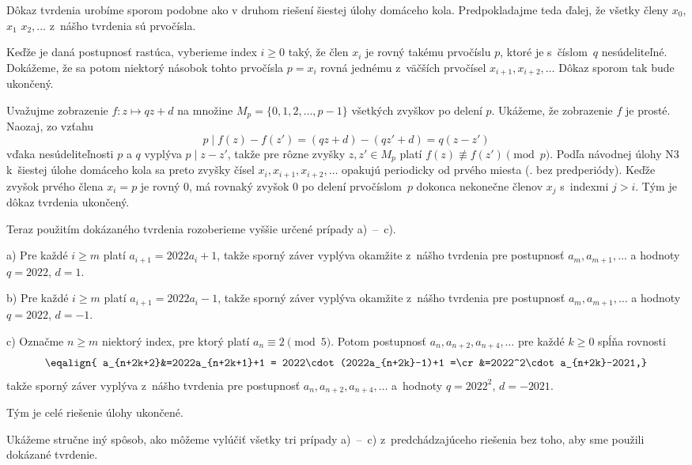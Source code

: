 {\smallskip
Dôkaz tvrdenia urobíme sporom podobne ako
v druhom riešení šiestej úlohy domáceho kola.
Predpokladajme teda ďalej, že všetky členy $x_0$, $x_1$
$x_2,\dots$ z~nášho tvrdenia sú prvočísla.

Keďže je daná postupnosť rastúca, vyberieme index $i\ge 0$ taký,
že člen $x_i$ je rovný takému prvočíslu $p$, ktoré je s~číslom~$q$
nesúdeliteľné. Dokážeme, že sa potom niektorý násobok
tohto prvočísla $p=x_i$ rovná jednému z~väčších prvočísel
$x_{i+1},x_{i+2},\dots$ Dôkaz sporom tak bude ukončený.

Uvažujme zobrazenie $f\colon z\mapsto qz+d$ na množine
$M_p=\{0,1,2,\dots,p-1\}$ všetkých zvyškov po delení $p$. Ukážeme,
že zobrazenie $f$ je prosté. Naozaj, zo vzťahu
$$
p\mid f(z)-f(z')=(qz+d)-(qz'+d)=q(z-z')
$$
vďaka nesúdeliteľnosti $p$ a $q$ vyplýva $p\mid z-z'$,
takže pre rôzne zvyšky $z,z'\in M_p$ platí $f(z)\nequiv f(z')\pmod p$.
Podľa návodnej úlohy N3 k~šiestej úlohe
domáceho kola sa preto zvyšky čísel $x_i,x_{i+1},x_{i+2},\dots$
opakujú periodicky od prvého miesta (\tj. bez predperiódy).
Keďže zvyšok prvého člena $x_i=p$ je rovný $0$, má rovnaký
zvyšok $0$ po delení prvočíslom~$p$
dokonca nekonečne členov $x_j$ s~indexmi $j>i$. Tým je dôkaz tvrdenia ukončený.

\smallskip
Teraz použitím dokázaného tvrdenia rozoberieme vyššie určené prípady
a)~--~c).

\item{a)} Pre každé $i\ge m$ platí $a_{i+1}=2022a_i+1$, takže sporný záver
vyplýva okamžite z~nášho tvrdenia pre postupnosť $a_m,a_{m+1},\dots$ a
hodnoty $q=2022$, $d=1$.
\item{b)} Pre každé $i\ge m$ platí $a_{i+1}=2022a_i-1$, takže sporný záver
vyplýva okamžite z~nášho tvrdenia pre postupnosť $a_m,a_{m+1},\dots$ a
hodnoty $q=2022$, $d={-1}$.
\item{c)} Označme $n\ge m$ niektorý index, pre ktorý platí
$a_n\equiv 2\pmod 5$. Potom postupnosť $a_n,a_{n+2},a_{n+4},\dots$
pre každé $k\ge 0$ spĺňa rovnosti
$$\eqalign{
a_{n+2k+2}&=2022a_{n+2k+1}+1 = 2022\cdot(2022a_{n+2k}-1)+1 =\cr
&=2022^2\cdot a_{n+2k}-2021,}
$$
takže sporný záver vyplýva z~nášho tvrdenia pre postupnosť
$a_n,a_{n+2},a_{n+4},\dots$ a~hodnoty $q=2022^2$, $d={-2021}$.

\noindent
Tým je celé riešenie úlohy ukončené.


\poznamka
Ukážeme stručne iný spôsob, ako môžeme vylúčiť všetky tri prípady a)~--~c) z~predchádzajúceho riešenia bez toho, aby sme použili dokázané tvrdenie.

}
